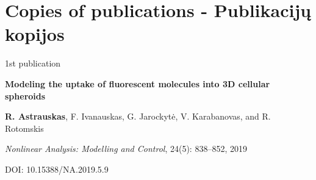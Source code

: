 \chapter*{Copies of publications - Publikacijų kopijos}
\label{cha:publicationscopies} 




\vspace*{15mm}

\begin{center}

{\huge 1st publication}
\vspace{10mm}

{\Large \bf Modeling the uptake of fluorescent molecules into 3D cellular spheroids}

\vspace{5mm}
\textbf{R. Astrauskas}, F. Ivanauskas, G. Jarockytė, V. Karabanovas, and R. Rotomskis

\vspace{5mm}
\textit{Nonlinear Analysis: Modelling and Control}, 24(5): 838--852, 2019


\vspace{3mm}
DOI: 10.15388/NA.2019.5.9

\end{center}

\newpage
